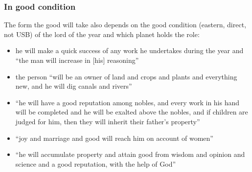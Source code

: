 \subsubsection{In good condition}
The form the good will take also depends on the good condition (eastern, direct, not USB) of the lord of the year and which planet holds the role:
\begin{itemize}[topsep=0em,itemsep=0em]
\item[\Mars] he will make a quick success of any work he undertakes during the year and ``the man will increase in [his] reasoning''

\item[\Saturn]  the person ``will be an owner of land and crops and plants and everything new, and he will dig canals and rivers''

\item[\Jupiter]  ``he will have a good reputation among nobles, and every work in his hand will be completed and he will be exalted above the nobles, and if children are judged for him, then they will inherit their father's property''

\item[\Venus]  ``joy and marriage and good will reach him on account of women''

\item[\Mercury]  ``he will accumulate property and attain good from wisdom and opinion and science and a good reputation, with the help of God''
\end{itemize}

